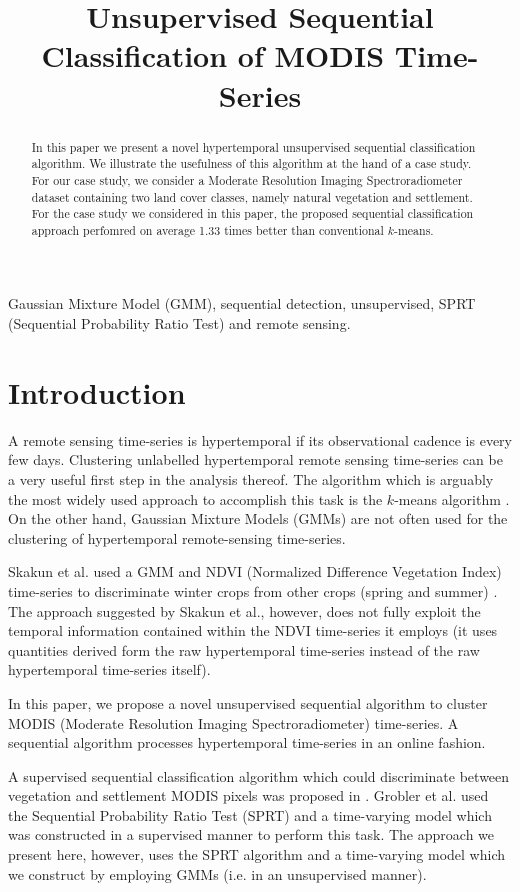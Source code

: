 \documentclass{article}
\title{Unsupervised Sequential Classification of MODIS Time-Series}
\begin{document}
%
\maketitle
%
\begin{abstract}
In this paper we present a novel hypertemporal unsupervised sequential classification algorithm. We illustrate the usefulness of this algorithm at the hand of a case study. For our case study, we consider a Moderate Resolution Imaging Spectroradiometer dataset containing two land cover classes, namely natural vegetation and settlement. For the 
case study we considered in this paper, the proposed sequential classification approach perfomred on average 1.33 times better than conventional $k$-means.
\end{abstract}
%
\begin{keywords}
Gaussian Mixture Model (GMM), sequential detection, unsupervised, SPRT (Sequential Probability Ratio Test) and remote sensing.
\end{keywords}
%

\section{Introduction}
\label{sec:intro}
A remote sensing time-series is hypertemporal if its observational 
cadence is every few days. Clustering unlabelled hypertemporal remote sensing time-series can be a very useful first step in the analysis thereof. The algorithm which is arguably the most widely used approach to accomplish this task is the $k$-means algorithm \cite{viovy2000}. On the other hand, Gaussian Mixture Models (GMMs) are not often used for the clustering of hypertemporal remote-sensing time-series.

Skakun et al. used a GMM and NDVI (Normalized Difference Vegetation Index) time-series to discriminate winter crops from other crops (spring and summer) \cite{skakun2017}. The approach suggested by Skakun et al., however, does not fully exploit the temporal information contained within the NDVI time-series it employs (it uses quantities derived form the raw hypertemporal time-series instead of the raw hypertemporal time-series itself).

In this paper, we propose a novel unsupervised sequential algorithm to cluster MODIS (Moderate Resolution Imaging Spectroradiometer) time-series. A sequential algorithm processes hypertemporal time-series in an online fashion. 

A supervised sequential classification algorithm which could discriminate 
between vegetation and settlement MODIS pixels was proposed in \cite{ackermann2011t,grobler2012c}. Grobler et al. used the Sequential Probability Ratio Test (SPRT) and a time-varying model which was constructed in a supervised manner to perform this task. The approach we present here, however, uses the SPRT algorithm and a time-varying model which we construct by employing GMMs (i.e. in an unsupervised manner).
\end{document}
